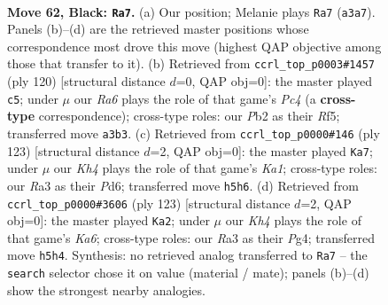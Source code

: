 \documentclass[11pt]{article}
\begin{document}
\clearpage

\begin{figure}[p]\centering
\begin{subfigure}{0.46\textwidth}\centering
\resizebox{\linewidth}{!}{%
\newchessgame
\chessboard[
  setfen={5K2/8/8/7k/8/r7/1p6/8 b - - 1 62},
  showmover=false,
  pgfstyle=straightmove, color=movearrow, markmove={a3-a7}
]}
\caption{}
\end{subfigure}\hfill
\begin{subfigure}{0.46\textwidth}\centering
\resizebox{\linewidth}{!}{%
\newchessgame
\chessboard[
  setfen={k7/8/8/5R2/2P5/8/6K1/8 w - - 1 61},
  showmover=false,
  pgfstyle=straightmove, color=movearrow, markmove={c4-c5}
]}
\caption{}
\end{subfigure}
\\[4pt]
\begin{subfigure}{0.46\textwidth}\centering
\resizebox{\linewidth}{!}{%
\newchessgame
\chessboard[
  setfen={k7/8/3p4/8/8/8/1K6/8 b - - 1 62},
  showmover=false,
  pgfstyle=straightmove, color=movearrow, markmove={a8-a7}
]}
\caption{}
\end{subfigure}\hfill
\begin{subfigure}{0.46\textwidth}\centering
\resizebox{\linewidth}{!}{%
\newchessgame
\chessboard[
  setfen={8/8/8/8/6p1/k7/8/3K4 b - - 7 62},
  showmover=false,
  pgfstyle=straightmove, color=movearrow, markmove={a3-a2}
]}
\caption{}
\end{subfigure}
\caption{\textbf{Move 62, Black: \texttt{Ra7}.} (a) Our position; Melanie plays \texttt{Ra7} (\texttt{a3a7}). Panels (b)--(d) are the retrieved master positions whose correspondence most drove this move (highest QAP objective among those that transfer to it). (b) Retrieved from \texttt{ccrl\_top\_p0003\#1457} (ply 120) [structural distance $d$=0, QAP obj=0]: the master played \texttt{c5}; under $\mu$ our \emph{Ra6} plays the role of that game's \emph{Pc4} (a \textbf{cross-type} correspondence); cross-type roles: our \emph{P}b2 as their \emph{R}f5; transferred move \texttt{a3b3}. (c) Retrieved from \texttt{ccrl\_top\_p0000\#146} (ply 123) [structural distance $d$=2, QAP obj=0]: the master played \texttt{Ka7}; under $\mu$ our \emph{Kh4} plays the role of that game's \emph{Ka1}; cross-type roles: our \emph{R}a3 as their \emph{P}d6; transferred move \texttt{h5h6}. (d) Retrieved from \texttt{ccrl\_top\_p0000\#3606} (ply 123) [structural distance $d$=2, QAP obj=0]: the master played \texttt{Ka2}; under $\mu$ our \emph{Kh4} plays the role of that game's \emph{Ka6}; cross-type roles: our \emph{R}a3 as their \emph{P}g4; transferred move \texttt{h5h4}. Synthesis: no retrieved analog transferred to \texttt{Ra7} -- the \texttt{search} selector chose it on value (material / mate); panels (b)--(d) show the strongest nearby analogies.}
\label{fig:thought-m123}
\end{figure}
\end{document}
